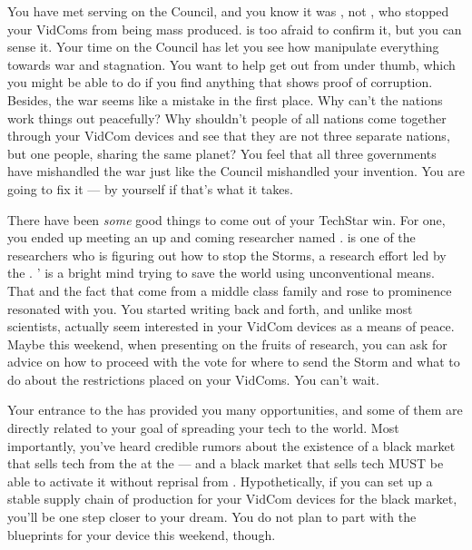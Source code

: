 \documentclass[char]{GL2020}
\begin{document}
You have met \cAntiChup{\them} serving on the Council, and you know it was \cAntiChup{\them}, not \cTechGod{}, who stopped your VidComs from being mass produced. \cScholarship{} is too afraid to confirm it, but you can sense it. Your time on the Council has let you see how \cAntiChup{\they} manipulate\cAntiChup{\verbs} everything towards war and stagnation. You want to help \cScholarship{} get out from under \cAntiChup{\their} thumb, which you might be able to do if you find anything that shows proof of \cAntiChup{\their} corruption. Besides, the war seems like a mistake in the first place. Why can't the nations work things out peacefully? Why shouldn't people of all nations come together through your VidCom devices and see that they are not three separate nations, but one people, sharing the same planet? You feel that all three governments have mishandled the war just like the Council mishandled your invention. You are going to fix it — by yourself if that's what it takes.

There have been \emph{some} good things to come out of your TechStar win. For one, you ended up meeting an up and coming researcher named \cAssistantScientist{\intro}.  \cAssistantScientist{} is one of the researchers who is figuring out how to stop the Storms, a research effort led by the \pTech{}. \cAssistantScientist{}’ is a bright mind trying to save the world using unconventional means. That and the fact that \cAssistantScientist{\they} come\cAssistantScientist{\verbs} from a middle class family and rose to prominence resonated with you. You started writing back and forth, and unlike most scientists, \cAssistantScientist{\they} actually seem\cAssistantScientist{\verbs} interested in your VidCom devices as a means of peace. Maybe this weekend, when \cAssistantScientist{\theyare} presenting on the fruits of \cAssistantScientist{\their} research, you can ask for advice on how to proceed with the vote for where to send the Storm and what to do about the restrictions placed on your VidComs. You can’t wait.  

Your entrance to the \pSchool{} has provided you many opportunities, and some of them are directly related to your goal of spreading your tech to the world. Most importantly, you've heard credible rumors about the existence of a black market that sells tech from the \pTech{} at the \pSc{} — and a black market that sells tech MUST be able to activate it without reprisal from \cTechGod{}. Hypothetically, if you can set up a stable supply chain of production for your VidCom devices for the black market, you'll be one step closer to your dream. You do not plan to part with the blueprints for your device this weekend, though.  
\end{document}
